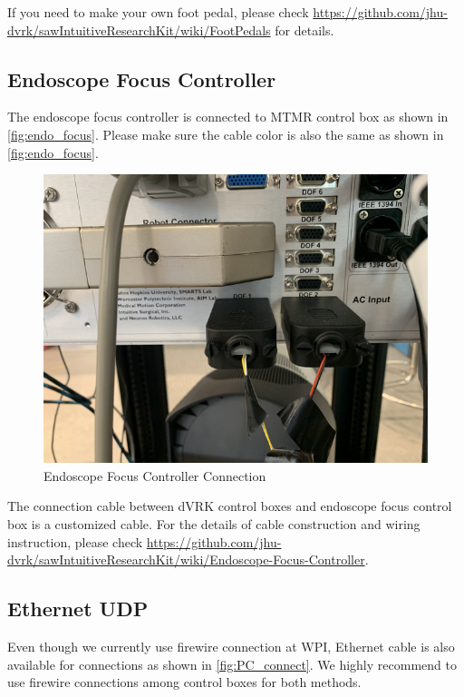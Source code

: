 If you need to make your own foot pedal, please check \url{https://github.com/jhu-dvrk/sawIntuitiveResearchKit/wiki/FootPedals} for details.

\subsection{Endoscope Focus Controller}

The endoscope focus controller is connected to MTMR control box as shown in \autoref{fig:endo_focus}. Please make sure the cable color is also the same as shown in \autoref{fig:endo_focus}.

\begin{figure}[H]
    \centering 
    \includegraphics[width=0.7\linewidth]{figures/camera_focus.png}
    \caption{Endoscope Focus Controller Connection}
    \label{fig:endo_focus}
\end{figure}

The connection cable between dVRK control boxes and endoscope focus control box is a customized cable. For the details of cable construction and wiring instruction, please check \url{https://github.com/jhu-dvrk/sawIntuitiveResearchKit/wiki/Endoscope-Focus-Controller}.

\subsection{Ethernet UDP}

Even though we currently use firewire connection at WPI, Ethernet cable is also available for connections as shown in \autoref{fig:PC_connect}. We highly recommend to use firewire connections among control boxes for both methods.

